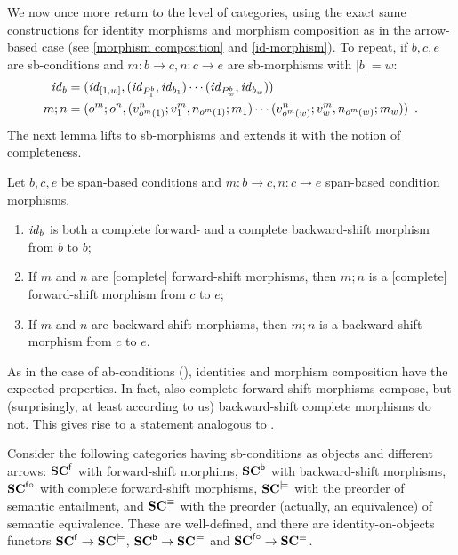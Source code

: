 %
We now once more return to the level of categories, using the exact same constructions for identity morphisms and morphism composition as in the arrow-based case (see \eqref{morphism composition} and \eqref{id-morphism}).
\iffull
To repeat, if $b,c,e$ are sb-conditions and $m:b\to c,n:c\to e$ are sb-morphisms with $|b|=w$:
%
\begin{align*}
\mathit{id}_b & = (\mathit{id}_{[1,w]},(\mathit{id}_{P^b_1},\mathit{id}_{b_1})\cdots
                       (\mathit{id}_{P^b_w},\mathit{id}_{b_w})) \\
m;n & = (o^m;o^n, (v^n_{o^m(1)};v^m_1,n_{o^m(1)};m_1)\cdots
                  (v^n_{o^m(w)};v^m_w,n_{o^m(w)};m_w)) \enspace.
\end{align*}
%
The next lemma lifts  to sb-morphisms and extends it with the notion of completeness.

\begin{lemma}
Let $b,c,e$ be span-based conditions and $m:b\to c,n:c\to e$ span-based condition morphisms.
\begin{enumerate}[topsep=\smallskipamount]
\item $\mathit{id}_b$ is both a complete forward- and a complete backward-shift morphism from $b$ to $b$;
\item If $m$ and $n$ are [complete] forward-shift morphisms, then $m;n$ is a [complete] forward-shift morphism from $c$ to $e$;
\item If $m$ and $n$ are backward-shift morphisms, then $m;n$ is a backward-shift morphism from $c$ to $e$.
\end{enumerate}
\end{lemma}
\else
As in the case of ab-conditions (), identities and morphism composition have the expected properties. In fact, also complete forward-shift morphisms compose, but (surprisingly, at least according to us) backward-shift complete morphisms do not. This gives rise to a statement analogous to .
\fi

\begin{theorem}
Consider the following categories having sb-conditions as objects and different arrows: 
$\mathbf{SC}^{\mathsf{f}}$ with forward-shift morphims, $\mathbf{SC}^{{\mathsf{b}}}$ with backward-shift morphisms, $\mathbf{SC}^{{\mathsf{f}}{\circ}}$ with complete forward-shift morphisms, $\mathbf{SC}^{\models}$ with the preorder of semantic entailment, and $\mathbf{SC}^\equiv$ with the preorder (actually, an equivalence) of semantic equivalence. These are well-defined, and there are identity-on-objects functors $\mathbf{SC}^{\mathsf{f}} \rightarrow \mathbf{SC}^{\models}$, $\mathbf{SC}^{\mathsf{b}} \rightarrow \mathbf{SC}^{\models}$ and $\mathbf{SC}^{{\mathsf{f}}{\circ}} \rightarrow \mathbf{SC}^{\equiv}$.
\end{theorem}

